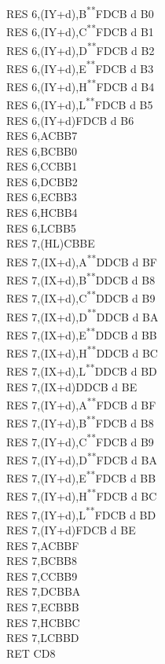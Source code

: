 \documentclass[12pt,twoside,openright,a4paper]{book}
\newcommand{\UNDOC}{\textnormal{\textsuperscript{**}}}
\begin{document}
\begin{multicols}{3}
{\begin{tabbing}
	RES 6,(IY+d),B\UNDOC\>FDCB d B0\\
	RES 6,(IY+d),C\UNDOC\>FDCB d B1\\
	RES 6,(IY+d),D\UNDOC\>FDCB d B2\\
	RES 6,(IY+d),E\UNDOC\>FDCB d B3\\
	RES 6,(IY+d),H\UNDOC\>FDCB d B4\\
	RES 6,(IY+d),L\UNDOC\>FDCB d B5\\
	RES 6,(IY+d)\>FDCB d B6\\
	RES 6,A\>CBB7\\
	RES 6,B\>CBB0\\
	RES 6,C\>CBB1\\
	RES 6,D\>CBB2\\
	RES 6,E\>CBB3\\
	RES 6,H\>CBB4\\
	RES 6,L\>CBB5\\
	RES 7,(HL)\>CBBE\\
	RES 7,(IX+d),A\UNDOC\>DDCB d BF\\
	RES 7,(IX+d),B\UNDOC\>DDCB d B8\\
	RES 7,(IX+d),C\UNDOC\>DDCB d B9\\
	RES 7,(IX+d),D\UNDOC\>DDCB d BA\\
	RES 7,(IX+d),E\UNDOC\>DDCB d BB\\
	RES 7,(IX+d),H\UNDOC\>DDCB d BC\\
	RES 7,(IX+d),L\UNDOC\>DDCB d BD\\
	RES 7,(IX+d)\>DDCB d BE\\
	RES 7,(IY+d),A\UNDOC\>FDCB d BF\\
	RES 7,(IY+d),B\UNDOC\>FDCB d B8\\
	RES 7,(IY+d),C\UNDOC\>FDCB d B9\\
	RES 7,(IY+d),D\UNDOC\>FDCB d BA\\
	RES 7,(IY+d),E\UNDOC\>FDCB d BB\\
	RES 7,(IY+d),H\UNDOC\>FDCB d BC\\
	RES 7,(IY+d),L\UNDOC\>FDCB d BD\\
	RES 7,(IY+d)\>FDCB d BE\\
	RES 7,A\>CBBF\\
	RES 7,B\>CBB8\\
	RES 7,C\>CBB9\\
	RES 7,D\>CBBA\\
	RES 7,E\>CBBB\\
	RES 7,H\>CBBC\\
	RES 7,L\>CBBD\\
	RET C\>D8\\

\end{tabbing}}
\end{multicols}
\end{document}
